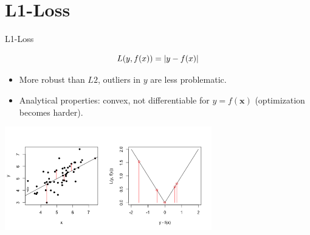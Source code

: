\section{L1-Loss}

\begin{vbframe}{L1-Loss}

\vspace*{-0.3cm}

$$
L(y, f(x)) = \left|y-f(x)\right|
$$

\begin{itemize}
\item More robust than $L2$, outliers in $y$ are less problematic.
\item Analytical properties: convex, not differentiable for $y = f(\bm{x})$ (optimization becomes harder).
\end{itemize}

\vspace*{-6mm}

\begin{center}
  \includegraphics[width = 9cm]{figure_man/loss_absolute_plot1.png} \\
\end{center}


\end{vbframe}



